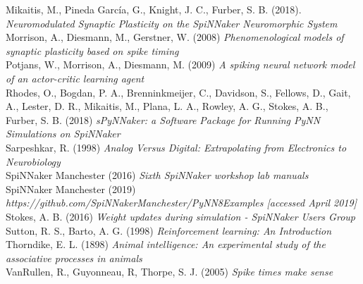 \documentclass[10pt]{article}
\begin{document}
    \noindent
    Mikaitis, M., Pineda García, G., Knight, J. C., Furber, S. B. (2018).  \textit{Neuromodulated Synaptic Plasticity on the SpiNNaker Neuromorphic System} \\[-3pt]

    \noindent
    Morrison, A., Diesmann, M., Gerstner, W. (2008) \textit{Phenomenological models of synaptic plasticity based on spike timing} \\[-3pt]

    \noindent
    Potjans, W., Morrison, A., Diesmann, M. (2009) \textit{A spiking neural network model of an actor-critic learning agent} \\[-3pt]

    \noindent
    Rhodes, O., Bogdan, P. A., Brenninkmeijer, C., Davidson, S., Fellows, D., Gait, A., Lester, D. R., Mikaitis, M., Plana, L. A., Rowley, A. G., Stokes, A. B., Furber, S. B. (2018) \textit{sPyNNaker: a Software Package for Running PyNN
    Simulations on SpiNNaker} \\[-3pt]

    \noindent
    Sarpeshkar, R. (1998) \textit{Analog Versus Digital: Extrapolating from Electronics to Neurobiology} \\[-3pt]

    \noindent
    SpiNNaker Manchester (2016) \textit{Sixth SpiNNaker workshop lab manuals} \\[-3pt]
    
    \noindent
    SpiNNaker Manchester (2019) \textit{https://github.com/SpiNNakerManchester/PyNN8Examples [accessed April 2019]} \\[-3pt]

    \noindent
    Stokes, A. B. (2016) \textit{Weight updates during simulation - SpiNNaker Users Group} \\[-3pt]

    \noindent
    Sutton, R. S., Barto, A. G. (1998) \textit{Reinforcement learning: An Introduction} \\[-3pt]

    \noindent
    Thorndike, E. L. (1898) \textit{Animal intelligence: An experimental study of the associative processes in animals} \\[-3pt]

    \noindent
    VanRullen, R., Guyonneau, R, Thorpe, S. J. (2005) \textit{Spike times make sense} \\[-3pt]
    
    
\end{document}
